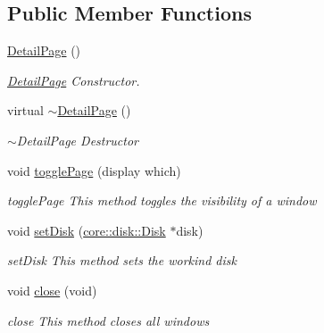 \subsection*{Public Member Functions}
\begin{DoxyCompactItemize}
\item 
\mbox{\hyperlink{classui_1_1window_1_1_detail_page_a151e61733c9f0cfbff77d58f161b15bf}{Detail\+Page}} ()
\begin{DoxyCompactList}\small\item\em \mbox{\hyperlink{classui_1_1window_1_1_detail_page}{Detail\+Page}} Constructor. \end{DoxyCompactList}\item 
virtual \mbox{\hyperlink{classui_1_1window_1_1_detail_page_ab50d547f466fa6b6bba924b79282aae1}{$\sim$\+Detail\+Page}} ()
\begin{DoxyCompactList}\small\item\em $\sim$\+Detail\+Page Destructor \end{DoxyCompactList}\item 
void \mbox{\hyperlink{classui_1_1window_1_1_detail_page_a1bbc24ad94c66e55e29ba208586a5bf5}{toggle\+Page}} (display which)
\begin{DoxyCompactList}\small\item\em toggle\+Page This method toggles the visibility of a window \end{DoxyCompactList}\item 
void \mbox{\hyperlink{classui_1_1window_1_1_detail_page_ad677d96003c9405071abed57a2310c9d}{set\+Disk}} (\mbox{\hyperlink{classcore_1_1disk_1_1_disk}{core\+::disk\+::\+Disk}} $\ast$disk)
\begin{DoxyCompactList}\small\item\em set\+Disk This method sets the workind disk \end{DoxyCompactList}\item 
void \mbox{\hyperlink{classui_1_1window_1_1_detail_page_a2eba9774cf72106a5b87357c2348f5ae}{close}} (void)
\begin{DoxyCompactList}\small\item\em close This method closes all windows \end{DoxyCompactList}\end{DoxyCompactItemize}
